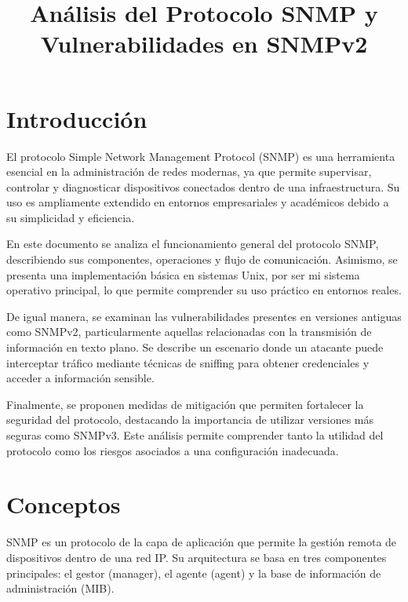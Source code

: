 \documentclass[12pt]{article}
\title{Análisis del Protocolo SNMP y Vulnerabilidades en SNMPv2}
\author{}
\date{}
\begin{document}
\maketitle

\newpage

\tableofcontents

\newpage

\section*{\textbf{Introducción}}

El protocolo Simple Network Management Protocol (SNMP) es una herramienta esencial en la administración de redes modernas, ya que permite supervisar, controlar y diagnosticar dispositivos conectados dentro de una infraestructura. Su uso es ampliamente extendido en entornos empresariales y académicos debido a su simplicidad y eficiencia.

En este documento se analiza el funcionamiento general del protocolo SNMP, describiendo sus componentes, operaciones y flujo de comunicación. Asimismo, se presenta una implementación básica en sistemas Unix, por ser mi sistema operativo principal, lo que permite comprender su uso práctico en entornos reales.

De igual manera, se examinan las vulnerabilidades presentes en versiones antiguas como SNMPv2, particularmente aquellas relacionadas con la transmisión de información en texto plano. Se describe un escenario donde un atacante puede interceptar tráfico mediante técnicas de sniffing para obtener credenciales y acceder a información sensible.

Finalmente, se proponen medidas de mitigación que permiten fortalecer la seguridad del protocolo, destacando la importancia de utilizar versiones más seguras como SNMPv3. Este análisis permite comprender tanto la utilidad del protocolo como los riesgos asociados a una configuración inadecuada.

\newpage

\section*{\textbf{Conceptos}}

SNMP es un protocolo de la capa de aplicación que permite la gestión remota de dispositivos dentro de una red IP. Su arquitectura se basa en tres componentes principales: el gestor (manager), el agente (agent) y la base de información de administración (MIB).
\end{document}
